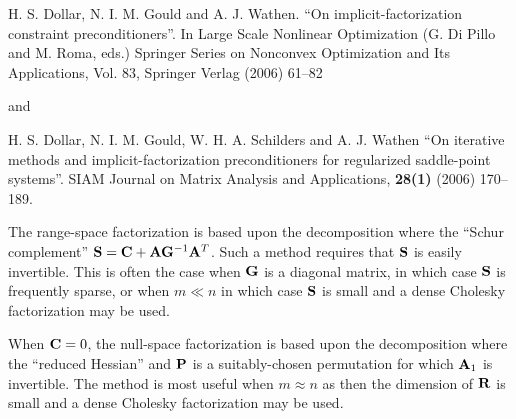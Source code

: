 \documentclass{galahad}
\begin{document}
\noindent
H. S. Dollar, N. I. M. Gould and A. J. Wathen.
``On implicit-factorization constraint preconditioners''.
In  Large Scale Nonlinear Optimization (G. Di Pillo and M. Roma, eds.)
Springer Series on Nonconvex Optimization and Its Applications, Vol. 83,
Springer Verlag (2006) 61--82

\noindent
and

\noindent
H. S. Dollar, N. I. M. Gould, W. H. A. Schilders and A. J. Wathen
``On iterative methods and implicit-factorization preconditioners for
regularized saddle-point systems''.
SIAM Journal on Matrix Analysis and Applications, {\bf 28(1)} (2006) 170--189.
\vspace*{1mm}

\noindent
The range-space factorization is based upon the decomposition
where the ``Schur complement'' ${\mathbf{S}} = {\mathbf{C}} + {\mathbf{A}} {\mathbf{G}}^{-1} {\mathbf{A}}^T$.
Such a method requires that ${\mathbf{S}}$ is easily invertible. This is often the
case when ${\mathbf{G}}$ is a diagonal matrix, in which case ${\mathbf{S}}$ is frequently
sparse, or when $m \ll n$ in which case ${\mathbf{S}}$
is small and a dense Cholesky factorization may be used.
\vspace*{1mm}

\noindent
When ${\mathbf{C}} = 0$, the null-space factorization is based upon the decomposition
where the ``reduced Hessian''
and ${\mathbf{P}}$ is a suitably-chosen permutation for which ${\mathbf{A}}_1$ is invertible.
The method is most useful when $m \approx n$ as then the dimension
of ${\mathbf{R}}$ is small and a dense Cholesky factorization may be used.
\end{document}
